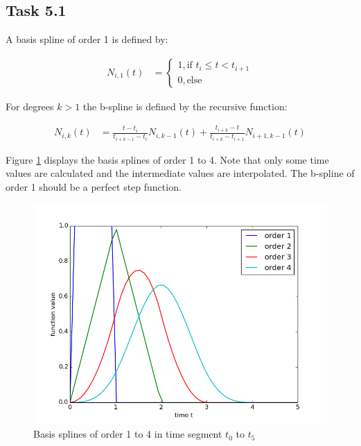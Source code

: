 \subsection*{Task 5.1}

A basis spline of order 1 is defined by:

\begin{align*}
	N_{i,1}(t) &= 
	\begin{cases}
	1, \text{if } t_i \le t < t_{i+1} \\
	0, \text{else} 
	\end{cases}
\end{align*}

For degrees $k > 1$ the b-spline is defined by the recursive function:

\begin{align*}
	N_{i,k}(t) &= \frac{t-t_i}{t_{i+k-1}-t_i}N_{i,k-1}(t)+\frac{t_{i+k}-t}{t_{i+k}-t_{i+1}}N_{i+1,k-1}(t)
\end{align*}

Figure \ref{fig:bspline} displays the basis splines of order 1 to 4. Note that only some time values are calculated and the intermediate values are interpolated. The b-spline of order 1 should be a perfect step function.
\begin{figure}[h]
	\includegraphics[scale=0.7]{Task_5_1.png}
	\caption{Basis splines of order 1 to 4 in time segment $t_0$ to $t_5$}
	\label{fig:bspline}
\end{figure}